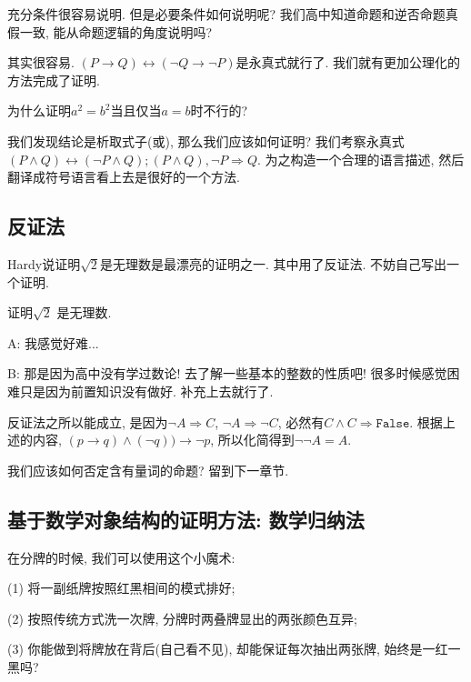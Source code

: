 充分条件很容易说明. 但是必要条件如何说明呢? 我们高中知道命题和逆否命题真假一致, 能从命题逻辑的角度说明吗? 

其实很容易. $(P\rightarrow Q )\leftrightarrow (\lnot Q\rightarrow\lnot P)$是永真式就行了. 我们就有更加公理化的方法完成了证明. 

\begin{prob}
	为什么证明$a^2=b^2$当且仅当$a=b$时不行的?
\end{prob}

我们发现结论是析取式子(或), 那么我们应该如何证明? 我们考察永真式$(P\land Q)\leftrightarrow(\lnot P \land Q); (P\land Q), \lnot P \Rightarrow Q$. 为之构造一个合理的语言描述, 然后翻译成符号语言看上去是很好的一个方法. 


\subsection*{反证法}

Hardy说证明$\sqrt 2$是无理数是最漂亮的证明之一. 其中用了反证法. 不妨自己写出一个证明. 

\begin{prob}
	证明$\sqrt{ 2}$ 是无理数. 
\end{prob}

\begin{dialogue}
	A: 我感觉好难...
	
	B: 那是因为高中没有学过数论! 去了解一些基本的整数的性质吧! 很多时候感觉困难只是因为前置知识没有做好. 补充上去就行了. 
\end{dialogue}
	

反证法之所以能成立, 是因为$\lnot A \Rightarrow C$, $\lnot A \Rightarrow \lnot C$, 必然有$C\land C \Rightarrow \texttt{False}$. 根据上述的内容, $(p\to q)\land (\lnot q))\to \lnot p$, 所以化简得到$\lnot \lnot A=A$. 

\begin{bonus}
	我们应该如何否定含有量词的命题? 留到下一章节.
\end{bonus}

\subsection*{基于数学对象结构的证明方法: 数学归纳法}

在分牌的时候, 我们可以使用这个小魔术: 

(1) 将一副纸牌按照红黑相间的模式排好;

(2) 按照传统方式洗一次牌, 分牌时两叠牌显出的两张颜色互异;

(3) 你能做到将牌放在背后(自己看不见), 却能保证每次抽出两张牌, 始终是一红一黑吗?

